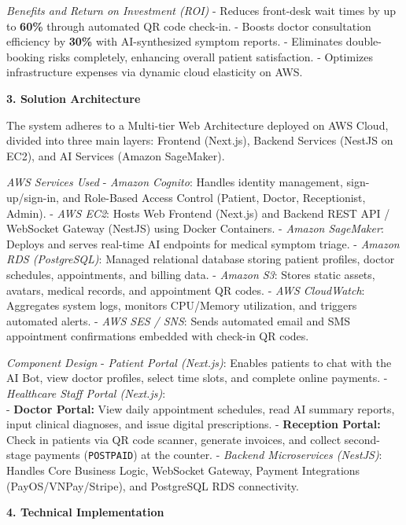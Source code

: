 \emph{Benefits and Return on Investment (ROI)} - Reduces front-desk wait
times by up to \textbf{60\%} through automated QR code check-in. -
Boosts doctor consultation efficiency by \textbf{30\%} with
AI-synthesized symptom reports. - Eliminates double-booking risks
completely, enhancing overall patient satisfaction. - Optimizes
infrastructure expenses via dynamic cloud elasticity on AWS.

\vspace{0.5em}\noindent\textbf{3. Solution Architecture}

The system adheres to a Multi-tier Web Architecture deployed on AWS
Cloud, divided into three main layers: Frontend (Next.js), Backend
Services (NestJS on EC2), and AI Services (Amazon SageMaker).

\emph{AWS Services Used} - \emph{Amazon Cognito}: Handles identity
management, sign-up/sign-in, and Role-Based Access Control (Patient,
Doctor, Receptionist, Admin). - \emph{AWS EC2}: Hosts Web Frontend
(Next.js) and Backend REST API / WebSocket Gateway (NestJS) using Docker
Containers. - \emph{Amazon SageMaker}: Deploys and serves real-time AI
endpoints for medical symptom triage. - \emph{Amazon RDS (PostgreSQL)}:
Managed relational database storing patient profiles, doctor schedules,
appointments, and billing data. - \emph{Amazon S3}: Stores static
assets, avatars, medical records, and appointment QR codes. - \emph{AWS
CloudWatch}: Aggregates system logs, monitors CPU/Memory utilization,
and triggers automated alerts. - \emph{AWS SES / SNS}: Sends automated
email and SMS appointment confirmations embedded with check-in QR codes.

\emph{Component Design} - \emph{Patient Portal (Next.js)}: Enables
patients to chat with the AI Bot, view doctor profiles, select time
slots, and complete online payments. - \emph{Healthcare Staff Portal
(Next.js)}:\\
- \textbf{Doctor Portal:} View daily appointment schedules, read AI
summary reports, input clinical diagnoses, and issue digital
prescriptions. - \textbf{Reception Portal:} Check in patients via QR
code scanner, generate invoices, and collect second-stage payments
(\texttt{POSTPAID}) at the counter. - \emph{Backend Microservices
(NestJS)}: Handles Core Business Logic, WebSocket Gateway, Payment
Integrations (PayOS/VNPay/Stripe), and PostgreSQL RDS connectivity.

\vspace{0.5em}\noindent\textbf{4. Technical Implementation}

